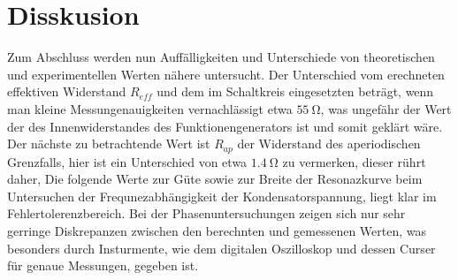     \section{Disskusion}
    \label{sec:Disskusion}
  Zum Abschluss werden nun Auffälligkeiten und Unterschiede von theoretischen und experimentellen Werten nähere untersucht.
  Der Unterschied vom erechneten effektiven Widerstand $R_{eff}$ und dem im Schaltkreis eingesetzten beträgt, wenn man kleine Messungenauigkeiten vernachlässigt
  etwa $\SI{55}{\ohm}$, was ungefähr der Wert der des Innenwiderstandes des Funktionengenerators ist und somit geklärt wäre.
  Der nächste zu betrachtende Wert ist $R_{ap}$ der Widerstand des aperiodischen Grenzfalls, hier ist ein Unterschied von etwa $\SI{1,4}{\ohm}$ zu vermerken, dieser rührt daher,
  Die folgende Werte zur Güte sowie zur Breite der Resonazkurve beim Untersuchen der Frequnezabhängigkeit der Kondensatorspannung, liegt klar im Fehlertolerenzbereich.
  Bei der Phasenuntersuchungen zeigen sich nur sehr gerringe Diskrepanzen zwischen den berechnten und gemessenen Werten, was besonders durch Insturmente, wie dem digitalen Oszilloskop und dessen Curser für genaue Messungen, gegeben ist.
\printbibliography

